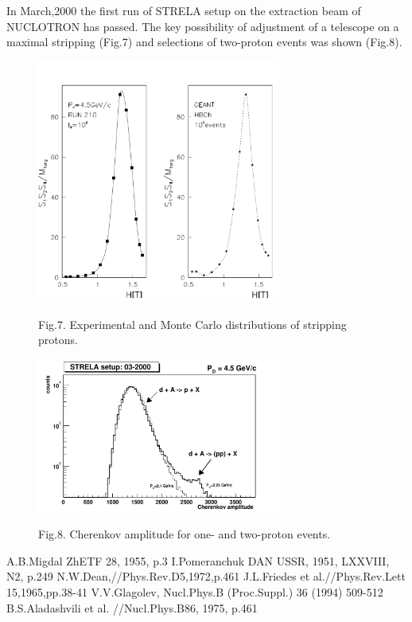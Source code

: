 \documentclass[a4paper,12pt]{article}
\begin{document}
In March,2000 the first run of STRELA setup on the extraction beam of NUCLOTRON
has passed. The key possibility of adjustment of a telescope on a maximal
stripping (Fig.7) and selections of two-proton events was shown (Fig.8).
\begin{figure}[hbt]
  \begin{center}
    \includegraphics[width=8cm]{s3ok.pdf}
  \end{center}
  \vspace{0,4mm}
  Fig.7. Experimental and Monte Carlo distributions of stripping protons.
\end{figure}
\begin{figure}[hbt]
  \begin{center}
    \includegraphics[width=8cm]{strela.pdf}
  \end{center}
  \vspace{0,4mm}
  Fig.8. Cherenkov amplitude for one- and two-proton events.\\
\end{figure}

\begin{thebibliography}{99}
   A.B.Migdal ZhETF 28, 1955, p.3
 I.Pomeranchuk DAN USSR, 1951, LXXVIII, N2, p.249
 N.W.Dean,//Phys.Rev.D5,1972,p.461
 J.L.Friedes et al.//Phys.Rev.Lett 15,1965,pp.38-41
 V.V.Glagolev, Nucl.Phys.B (Proc.Suppl.) 36 (1994) 509-512
 B.S.Aladashvili et al. //Nucl.Phys.B86, 1975, p.461
\end{thebibliography}
\end{document}
